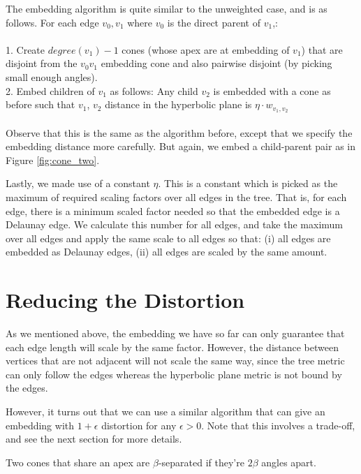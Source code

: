 The embedding algorithm is quite similar to the unweighted case, and is as follows. For each edge $v_0, v_1$ where $v_0$ is the direct parent of $v_1$,: \\
\horrule{0.5pt} \\
1. Create $degree(v_1) - 1$ cones (whose apex are at embedding of $v_1$) that are disjoint from the $v_0v_1$ embedding cone and also pairwise disjoint (by picking small enough angles). \\
2. Embed children of $v_1$ as follows: Any child $v_2$ is embedded with a cone as before such that $v_1$, $v_2$ distance in the hyperbolic plane is $\eta \cdot w_{v_1, v_2}$  \\
\horrule{0.5pt} \\

Observe that this is the same as the algorithm before, except that we specify the embedding distance more carefully. But again, we embed a child-parent pair as in Figure \ref{fig:cone_two}.

Lastly, we made use of a constant $\eta$. This is a constant which is picked as the maximum of required scaling factors over all edges in the tree. That is, for each edge, there is a minimum scaled factor needed so that the embedded edge is a Delaunay edge. We calculate this number for all edges, and take the maximum over all edges and apply the same scale to all edges so that: (i) all edges are embedded as Delaunay edges, (ii) all edges are scaled by the same amount.

\section{Reducing the Distortion}
As we mentioned above, the embedding we have so far can only guarantee that each edge length will scale by the same factor. However, the distance between vertices that are not adjacent will not scale the same way, since the tree metric can only follow the edges whereas the hyperbolic plane metric is not bound by the edges.

However, it turns out that we can use a similar algorithm that can give an embedding with $1 + \epsilon$ distortion for any $\epsilon > 0$. Note that this involves a trade-off, and see the next section for more details.

\begin{definition}
Two cones that share an apex are $\beta$-separated if they're $2\beta$ angles apart.
\end{definition}

